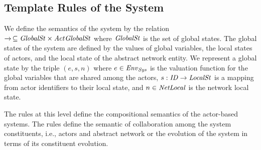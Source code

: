\subsection{Template Rules of the System}
We define the semantics of the system by the relation $\overto{}\,\subseteq \gstate\times\Act \gstate $ where $\mathit{GlobalSt}$ is the set of global states. The global states of the system are defined by the values of global variables, the local states of actors, and the local state of the abstract network entity. We represent a global state by the triple $(e,s,n)$ where $e\in\mathit{Env}_{\it Sys}$ is the valuation function for the global variables that are shared among the actors, $s: \mathit{ID}\rightarrow \mathit{LocalSt}$ is a mapping from actor identifiers to their local state, and $n\in {\it NetLocal}$ is the network local state. %

The rules at this level define the compositional semantics of the actor-based systems. The rules define the semantic of collaboration among the system constituents, i.e., actors and abstract network or the evolution of the system in terms of its constituent evolution.  

